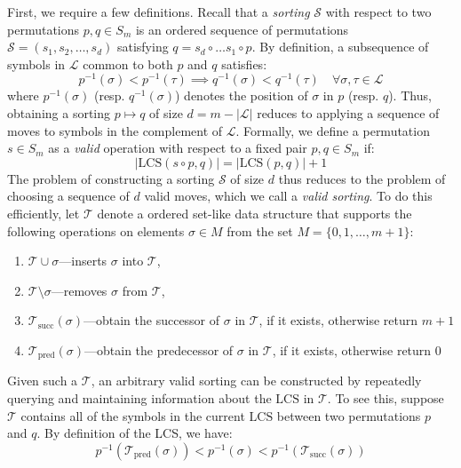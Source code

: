 \documentclass[sn-mathphys]{sn-jnl}
\begin{document}
First, we require a few definitions. Recall that a \emph{sorting} $\mathcal{S}$ with respect to two permutations $p, q \in S_m$ is an ordered sequence of permutations $\mathcal{S} = (s_1, s_2, \dots, s_d)$ satisfying $q = s_d \circ \dots s_1 \circ p$.
By definition, a subsequence of symbols in $\mathcal{L}$ common to both $p$ and $q$ satisfies:
\begin{equation}
	p^{-1}(\sigma) < p^{-1}(\tau) \implies q^{-1}(\sigma) < q^{-1}(\tau) \quad \forall \sigma, \tau \in \mathcal{L}
\end{equation}
 where $p^{-1}(\sigma)$ (resp. $q^{-1}(\sigma)$) denotes the position of $\sigma$ in $p$ (resp. $q$). Thus, obtaining a sorting $p \mapsto q$ of size $d = m - \lvert \mathcal{L} \rvert$ reduces to applying a sequence of moves to symbols in the complement of $\mathcal{L}$. 
 Formally, we define a permutation $s \in S_m$ as a \emph{valid} operation with respect to a fixed pair $p, q \in S_m$ if:
 \begin{equation}\label{eq:valid_move}
 	\lvert \mathrm{LCS}(s \circ p, q) \rvert = \lvert \mathrm{LCS}(p,q) \rvert + 1
 \end{equation}
  The problem of constructing a sorting $\mathcal{S}$ of size $d$ thus reduces to the problem of choosing a sequence of $d$ valid moves, which we call a \emph{valid sorting}. To do this efficiently, let $\mathcal{T}$ denote a ordered set-like data structure that supports the following operations on elements $\sigma \in M$ from the set $M = \{0, 1, \dots, m+1\}$:
  \begin{enumerate}
  	\item $\mathcal{T} \cup \sigma$---inserts $\sigma$ into $\mathcal{T}$,
  	\item $\mathcal{T} \setminus \sigma$---removes $\sigma$ from $\mathcal{T}$,
  	\item $\mathcal{T}_{\mathrm{succ}}(\sigma)$---obtain the successor of $\sigma$ in $\mathcal{T}$, if it exists, otherwise return $m+1$
  	\item $\mathcal{T}_{\mathrm{pred}}(\sigma)$---obtain the predecessor of $\sigma$ in $\mathcal{T}$, if it exists, otherwise return $0$
  \end{enumerate}
  Given such a $\mathcal{T}$, an arbitrary valid sorting can be constructed by repeatedly querying and maintaining information about the $\mathrm{LCS}$ in $\mathcal{T}$. To see this, suppose $\mathcal{T}$ contains all of the symbols in the current $\mathrm{LCS}$ between two permutations $p$ and $q$. By definition of the LCS, we have:
 \begin{equation}\label{eq:valid_move_ineq}
 	p^{-1}(\mathcal{T}_{\mathrm{pred}}(\sigma)) < p^{-1}(\sigma) < p^{-1}(\mathcal{T}_{\mathrm{succ}}(\sigma))
 \end{equation}
\end{document}
